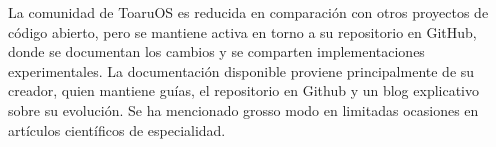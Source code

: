 La comunidad de ToaruOS es reducida en comparación con otros proyectos de código abierto, pero se mantiene activa en torno a su repositorio en GitHub, donde se documentan los cambios y se comparten implementaciones experimentales. La documentación disponible proviene principalmente de su creador, quien mantiene guías, el repositorio en Github y un blog explicativo sobre su evolución. Se ha mencionado grosso modo en limitadas ocasiones en artículos científicos de especialidad.